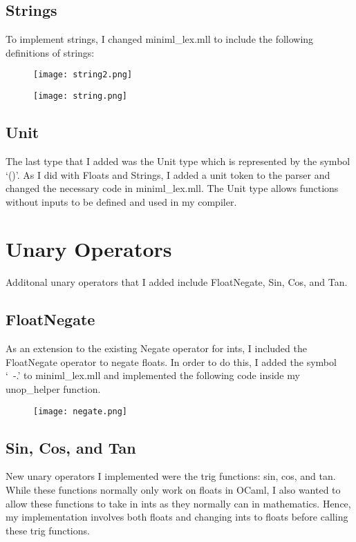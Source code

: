 \documentclass[12pt]{article}
\begin{document}
\subsection*{Strings}
To implement strings, I changed miniml\_lex.mll to include the following definitions of strings:

\begin{figure}[hbt]
    \centering
    \texttt{[image: string2.png]}
\end{figure}
\begin{figure}[hbt]
    \centering
    \texttt{[image: string.png]}
\end{figure}

\subsection*{Unit}
The last type that I added was the Unit type which is represented by the symbol `()'. As I did with Floats and Strings, I added a unit token to the parser and changed the necessary code in miniml\_lex.mll. The Unit type allows functions without inputs to be defined and used in my compiler. 


\section{Unary Operators}
Additonal unary operators that I added include FloatNegate, Sin, Cos, and Tan.

\subsection*{FloatNegate}
As an extension to the existing Negate operator for ints, I included the FloatNegate operator to negate floats. In order to do this, I added the symbol `~-.' to miniml\_lex.mll and implemented the following code inside my unop\_helper function.

\begin{figure}[hbt]
    \centering
    \texttt{[image: negate.png]}
\end{figure}

\subsection*{Sin, Cos, and Tan}
New unary operators I implemented were the trig functions: sin, cos, and tan. While these functions normally only work on floats in OCaml, I also wanted to allow these functions to take in ints as they normally can in mathematics. Hence, my implementation involves both floats and changing ints to floats before calling these trig functions.
\end{document}
